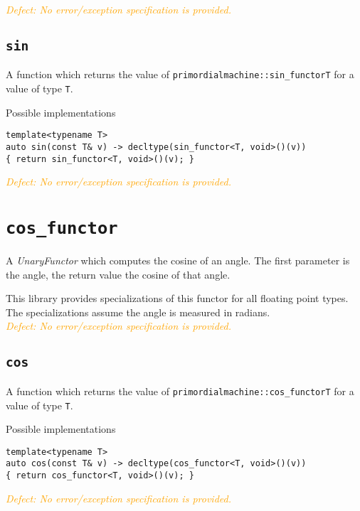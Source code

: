 \documentclass[oneside]{book}
\begin{document}
\noindent{}\textcolor{orange}{\textit{Defect: No error/exception specification is provided.}}

\subsection{\texttt{sin}}
A function which returns the value of \texttt{primordialmachine::sin\_functor\textlangle T\textrangle}
for a value of type \texttt{T}.

\noindent{}Possible implementations
\begin{verbatim}
template<typename T>
auto sin(const T& v) -> decltype(sin_functor<T, void>()(v))
{ return sin_functor<T, void>()(v); }
\end{verbatim}

\noindent{}\textcolor{orange}{\textit{Defect: No error/exception specification is provided.}}

\section{\texttt{cos\_functor}}
A \textit{UnaryFunctor} which computes the
cosine
of an angle.
The first parameter is the angle, the return value the cosine of that angle.

\noindent{}This library provides specializations of this functor for all floating point types.
The specializations assume the angle is measured in radians.\\

\noindent{}\textcolor{orange}{\textit{Defect: No error/exception specification is provided.}}

\subsection{\texttt{cos}}
A function which returns the value of \texttt{primordialmachine::cos\_functor\textlangle T\textrangle}
for a value of type \texttt{T}.

\noindent{}Possible implementations
\begin{verbatim}
template<typename T>
auto cos(const T& v) -> decltype(cos_functor<T, void>()(v))
{ return cos_functor<T, void>()(v); }
\end{verbatim}

\noindent{}\textcolor{orange}{\textit{Defect: No error/exception specification is provided.}}

\end{document}
